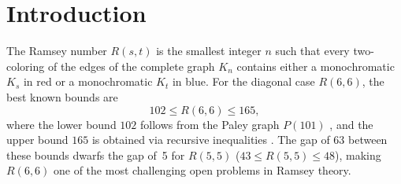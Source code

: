\documentclass[11pt,a4paper]{article}
\theoremstyle{plain}
\theoremstyle{remark}
\begin{document}
\section{Introduction}
\label{sec:intro}

The Ramsey number $R(s,t)$ is the smallest integer $n$ such that every
two-coloring of the edges of the complete graph $K_n$ contains either a
monochromatic $K_s$ in red or a monochromatic $K_t$ in blue.
For the diagonal case $R(6,6)$, the best known bounds are
\begin{equation}\label{eq:r66bounds}
  102 \leq R(6,6) \leq 165,
\end{equation}
where the lower bound $102$ follows from the Paley graph $P(101)$
\cite{radziszowski2021}, and the upper bound $165$ is obtained via
recursive inequalities \cite{exoo1998,radziszowski2021}.
The gap of 63 between these bounds dwarfs the gap of~5 for $R(5,5)$
($43 \leq R(5,5) \leq 48$), making $R(6,6)$ one of the most challenging
open problems in Ramsey theory.
\end{document}
